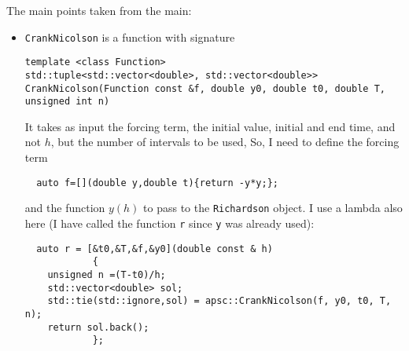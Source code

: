 \documentclass[10pt,a4paper,twoside]{article}
\begin{document}
The main points taken from the main:
\begin{itemize}
\item \lstinline!CrankNicolson! is a function with signature
\begin{lstlisting}
template <class Function>
std::tuple<std::vector<double>, std::vector<double>>
CrankNicolson(Function const &f, double y0, double t0, double T, unsigned int n)
\end{lstlisting}
It takes as input the forcing term, the initial value, initial and end time, and not $h$, but the number of intervals to be used,
So, I need to define the forcing term
\begin{lstlisting}
  auto f=[](double y,double t){return -y*y;};
\end{lstlisting}
and the function $y(h)$ to pass to the \lstinline!Richardson! object. I use a lambda also here (I have called the function \lstinline!r! since
\lstinline!y! was already used):
\begin{lstlisting}
  auto r = [&t0,&T,&f,&y0](double const & h)
            {
    unsigned n =(T-t0)/h;
    std::vector<double> sol;
    std::tie(std::ignore,sol) = apsc::CrankNicolson(f, y0, t0, T, n);
    return sol.back();
            };


\end{lstlisting}
\end{itemize}
\end{document}

